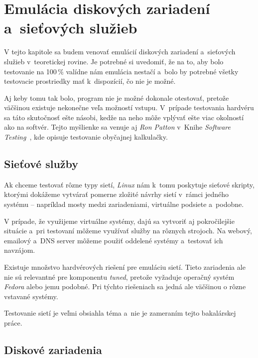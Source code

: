 %
%

\chapter{Emulácia diskových zariadení a~sieťových služieb}

V tejto kapitole sa budem venovať emulácií diskových zariadení a~sieťových
služieb v~teoretickej rovine. Je potrebné si uvedomiť, že na to, aby bolo
testovanie na 100\,\% valídne nám emulácia nestačí a~bolo by potrebné všetky
testovacie prostriedky mať k~dispozícií, čo nie je možné.

Aj keby tomu tak bolo, program nie je možné dokonale otestovať, pretože
väčšinou existuje nekonečne veľa možností vstupu. V~prípade testovania hardvéru
sa táto skutočnosť ešte násobi, kedže na neho môže vplývať ešte viac okolností
ako na softvér. Tejto myšlienke sa venuje aj \emph{Ron Patton} v~Knihe
\emph{Software Testing}~\cite{Software_testing_patton}, kde opisuje testovanie
obyčajnej kalkulačky.

\section{Sieťové služby}

Ak chceme testovať rôzne typy sietí, \emph{Linux} nám k~tomu poskytuje sieťové
skripty, ktorými dokážeme vytvárať pomerne zložité návrhy sietí v~rámci jedného
systému -- napríklad mosty medzi zariadeniami, virtuálne podsiete a~podobne.

V prípade, že využijeme virtuálne systémy, dajú sa vytvoriť aj pokročilejšie
situácie a~pri testovaní môžeme využívať služby na rôznych strojoch. Na webový,
emailový a~DNS server môžeme použiť oddelené systémy a~testovať ich navzájom.

Existuje množstvo hardvérových riešení pre emuláciu sietí. Tieto zariadenia ale
nie sú relevantné pre komponentu \emph{tuned}, pretože vyžaduje operačný systém
\emph{Fedora} alebo jemu podobné. Pri týchto riešeniach sa jedná ale väčšinou o
rôzne vstavané systémy.

Testovanie sietí je veľmi obsiahla téma a~nie je zameraním tejto bakalárskej
práce.

%
%

\section{Diskové zariadenia}

